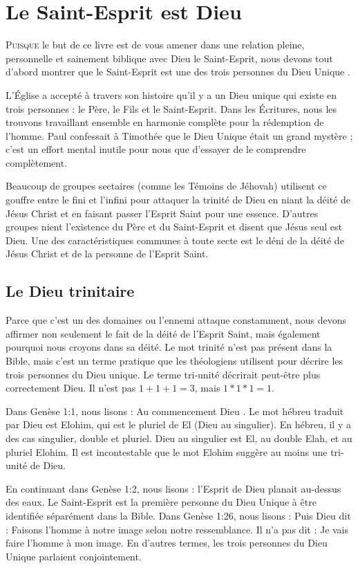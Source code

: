 \chapter{Le Saint-Esprit est Dieu}

\lettrine[lines=3]{P}{uisque} le but de ce livre est de vous amener dans une relation pleine, personnelle et sainement biblique avec Dieu le Saint-Esprit, nous devons tout d'abord montrer que le Saint-Esprit est une des trois personnes du Dieu Unique .

L'Église a accepté à travers son histoire qu'il y a un Dieu unique qui existe en trois personnes : le Père, le Fils et le Saint-Esprit. Dans les Écritures, nous les trouvons travaillant ensemble en harmonie complète pour la rédemption de l'homme. Paul confessait à Timothée que le Dieu Unique était un grand mystère ; c'est un effort mental inutile pour nous que d'essayer de le comprendre complètement.

Beaucoup de groupes sectaires (comme les Témoins de Jéhovah) utilisent ce gouffre entre le fini et l'infini pour attaquer la trinité de Dieu en niant la déité de Jésus Christ et en faisant passer l'Esprit Saint pour une essence. D'autres groupes nient l'existence du Père et du Saint-Esprit et disent que Jésus seul est Dieu. Une des caractéristiques communes à toute secte est le déni de la déité de Jésus Christ et de la personne de l'Esprit Saint.

\section{Le Dieu trinitaire}

Parce que c'est un des domaines ou l'ennemi attaque constamment, nous devons affirmer non seulement le fait de la déité de l'Esprit Saint, mais également pourquoi nous croyons dans sa déité. Le mot \og trinité \fg{} n'est pas présent dans la Bible, mais c'est un terme pratique que les théologiens utilisent pour décrire les trois personnes du Dieu unique. Le terme \og tri-unité \fg{} décrirait peut-être plus correctement Dieu. Il n'est pas $1 + 1 + 1 = 3$, mais $1 * 1 * 1 = 1$.

Dans Genèse 1:1, nous lisons : \og Au commencement Dieu \fg{}. Le mot hébreu traduit par \og Dieu \fg{} est Elohim, qui est le pluriel de El (Dieu au singulier). En hébreu, il y a des cas singulier, double et pluriel. \og Dieu \fg{} au singulier est El, au double Elah, et au pluriel Elohim. Il est incontestable que le mot \og Elohim \fg{} suggère au moins une tri-unité de Dieu.

En continuant dans Genèse 1:2, nous lisons : \og l'Esprit de Dieu planait au-dessus des eaux. \fg{} Le Saint-Esprit est la première personne du Dieu Unique à être identifiée séparément dans la Bible. Dans Genèse 1:26, nous lisons : \og Puis Dieu dit : Faisons l'homme à notre image selon notre ressemblance. \fg{} Il n'a pas dit : \og Je vais faire l'homme à mon image. \fg{} En d'autres termes, les trois personnes du Dieu Unique parlaient conjointement.
